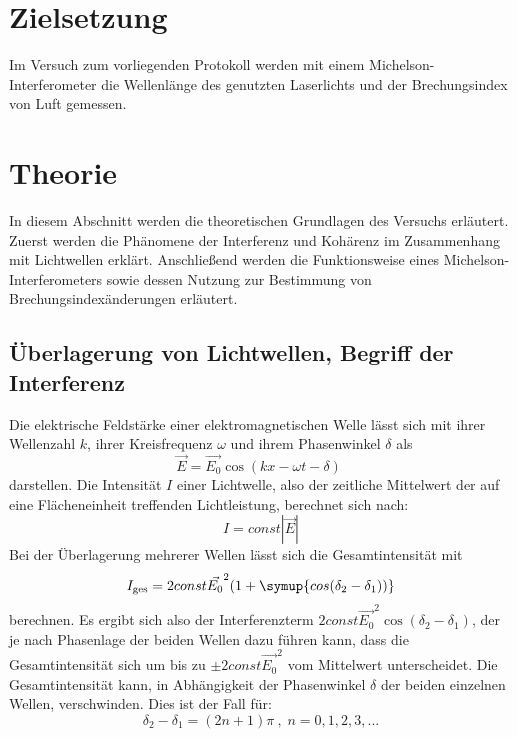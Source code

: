 \section*{Zielsetzung}
\label{sec:zielsetzung}

Im Versuch zum vorliegenden Protokoll werden mit einem Michelson-Interferometer die Wellenlänge des genutzten Laserlichts und der Brechungsindex von Luft gemessen.

\section{Theorie}
\label{sec:Theorie}
In diesem Abschnitt werden die theoretischen Grundlagen des Versuchs erläutert. Zuerst werden die Phänomene der Interferenz und Kohärenz im Zusammenhang mit Lichtwellen erklärt. Anschließend werden die Funktionsweise eines Michelson-Interferometers sowie dessen Nutzung zur Bestimmung von Brechungsindexänderungen erläutert.
\subsection{Überlagerung von Lichtwellen, Begriff der Interferenz}
Die elektrische Feldstärke einer elektromagnetischen Welle lässt sich mit ihrer Wellenzahl $k$, ihrer Kreisfrequenz $\omega$ und ihrem Phasenwinkel $\delta$ als
\begin{equation}
    \label{eqn:emwelle}
    \vec{E} = \vec{E_0} \cos(kx - \omega t - \delta) \; 
\end{equation}
darstellen. \newline
Die Intensität $I$ einer Lichtwelle, also der zeitliche Mittelwert der auf eine Flächeneinheit treffenden Lichtleistung, berechnet sich nach:
\begin{equation}
    \label{eqn:Intensität}
    I = const |\vec{E}|
\end{equation}
Bei der Überlagerung mehrerer Wellen lässt sich die Gesamtintensität mit
\begin{equation}
    I_\text{ges} = 2 const \vec{E_0}^2 (1 + \symup{cos(\delta_2 - \delta_1))}
\end{equation}
berechnen. Es ergibt sich also der Interferenzterm $ 2 const \vec{E_0}^2 \cos(\delta_2 - \delta_1) $, der je nach Phasenlage der beiden Wellen dazu führen kann, dass die Gesamtintensität sich um bis zu $\pm 2 const \vec{E_0}^2 $ vom Mittelwert unterscheidet.
Die Gesamtintensität kann, in Abhängigkeit der Phasenwinkel $\delta$ der beiden einzelnen Wellen, verschwinden. Dies ist der Fall für:
\begin{equation}
    \delta_2 - \delta_1 = (2n + 1)\pi \: , \; n = 0,1,2,3,... 
\end{equation}

